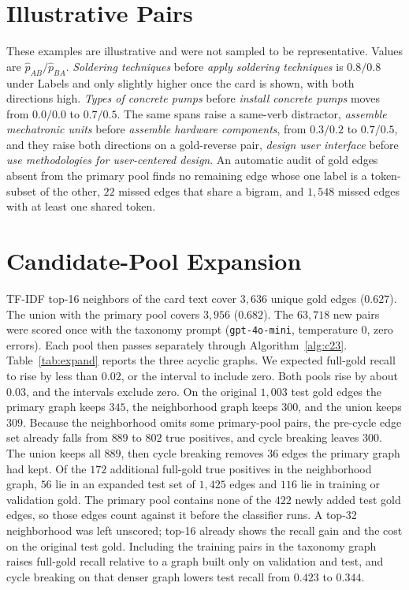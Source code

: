 \documentclass{ws-ijait}
\newcommand{\phat}{\hat{p}}
\begin{document}
\section{Illustrative Pairs}
\label{app:examples}
These examples are illustrative and were not sampled to be
representative.
Values are $\phat_{AB}/\phat_{BA}$.
\emph{Soldering techniques} before \emph{apply soldering techniques}
is $0.8/0.8$ under Labels and only slightly higher once the card is
shown, with both directions high.
\emph{Types of concrete pumps} before \emph{install concrete pumps}
moves from $0.0/0.0$ to $0.7/0.5$.
The same spans raise a same-verb distractor, \emph{assemble
mechatronic units} before \emph{assemble hardware components}, from
$0.3/0.2$ to $0.7/0.5$, and they raise both directions on a
gold-reverse pair, \emph{design user interface} before \emph{use
methodologies for user-centered design}.
An automatic audit of gold edges absent from the primary pool finds
no remaining edge whose one label is a token-subset of the other,
$22$ missed edges that share a bigram, and $1{,}548$ missed edges
with at least one shared token.

\section{Candidate-Pool Expansion}
\label{app:pool}
{TF}-{IDF} top-16 neighbors of the card text cover $3{,}636$ unique
gold edges ($0.627$).
The union with the primary pool covers $3{,}956$ ($0.682$).
The $63{,}718$ new pairs were scored once with the taxonomy prompt
(\texttt{gpt-4o-mini}, temperature $0$, zero errors).
Each pool then passes separately through Algorithm~\ref{alg:c23}.
Table~\ref{tab:expand} reports the three acyclic graphs.
We expected full-gold recall to rise by less than $0.02$, or the
interval to include zero.
Both pools rise by about $0.03$, and the intervals exclude zero.
On the original $1{,}003$ test gold edges the primary graph keeps
$345$, the neighborhood graph keeps $300$, and the union keeps
$309$.
Because the neighborhood omits some primary-pool pairs, the
pre-cycle edge set already falls from $889$ to $802$ true positives,
and cycle breaking leaves $300$.
The union keeps all $889$, then cycle breaking removes $36$ edges
the primary graph had kept.
Of the $172$ additional full-gold true positives in the neighborhood
graph, $56$ lie in an expanded test set of $1{,}425$ edges and $116$
lie in training or validation gold.
The primary pool contains none of the $422$ newly added test gold
edges, so those edges count against it before the classifier runs.
A top-32 neighborhood was left unscored; top-16 already shows the
recall gain and the cost on the original test gold.
Including the training pairs in the taxonomy graph raises full-gold
recall relative to a graph built only on validation and test, and
cycle breaking on that denser graph lowers test recall from $0.423$
to $0.344$.
\end{document}
